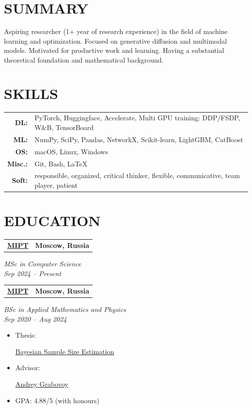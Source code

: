 \documentclass[11pt,a4paper]{moderncv}
\newcommand*{\educationentry}[4][0.5mm]{
    \begin{tabularx}{\textwidth}{LR}
        {\bfseries #3} & {\bfseries #4} \\
    \end{tabularx}
    {\itshape #2}
    \par\addvspace{#1}
}
\begin{document}
\hfill
\begin{minipage}[t]{0.35\textwidth}

\section{SUMMARY}
Aspiring researcher (1+ year of research experience) in the field of machine learning and optimization. Focused on generative diffusion and multimodal models. Motivated for productive work and learning. Having a substantial theoretical foundation and mathematical background.

\section{SKILLS}
\begin{tabularx}{\textwidth}{>{\bfseries}r@{\hskip 3.5mm}L}
DL: & PyTorch, Huggingface, Accelerate, Multi GPU training: DDP/FSDP, W\&B, TensorBoard \\
ML: & NumPy, SciPy, Pandas, NetworkX, Scikit-learn, LightGBM, CatBoost \\
OS: & macOS, Linux, Windows \\
Misc.: & Git, Bash, \LaTeX \\
Soft: & responsible, organized, critical thinker, flexible, communicative, team player, patient
\end{tabularx}

\section{EDUCATION}

\educationentry{MSc in Computer Science\\Sep 2024 -- Present}{\href{https://mipt.ru}{MIPT}}{Moscow, Russia}

\educationentry{BSc in Applied Mathematics and Physics\\Sep 2020 -- Aug 2024}{\href{https://mipt.ru}{MIPT}}{Moscow, Russia}
\begin{itemize}
\item Thesis: \par \href{https://github.com/intsystems/Kiselev-BS-Thesis}{Bayesian Sample Size Estimation}
\item Advisor: \par \href{https://andriygav.github.io}{Andrey Grabovoy}
\item GPA: 4.88/5 (with honours)
\end{itemize}


\end{minipage}
\end{document}
